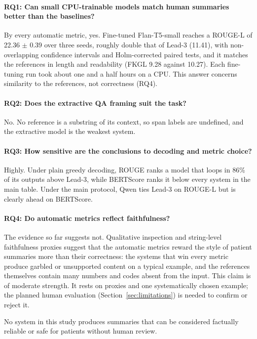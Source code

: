 \paragraph{RQ1: Can small CPU-trainable models match human summaries better than the baselines?} By every automatic metric, yes. Fine-tuned Flan-T5-small reaches a ROUGE-L of 22.36 $\pm$ 0.39 over three seeds, roughly double that of Lead-3 (11.41), with non-overlapping confidence intervals and Holm-corrected paired tests, and it matches the references in length and readability (FKGL 9.28 against 10.27). Each fine-tuning run took about one and a half hours on a CPU. This answer concerns similarity to the references, not correctness (RQ4).

\paragraph{RQ2: Does the extractive QA framing suit the task?} No. No reference is a substring of its context, so span labels are undefined, and the extractive model is the weakest system.

\paragraph{RQ3: How sensitive are the conclusions to decoding and metric choice?} Highly. Under plain greedy decoding, ROUGE ranks a model that loops in 86\% of its outputs above Lead-3, while BERTScore ranks it below every system in the main table. Under the main protocol, Qwen ties Lead-3 on ROUGE-L but is clearly ahead on BERTScore.

\paragraph{RQ4: Do automatic metrics reflect faithfulness?} The evidence so far suggests not. Qualitative inspection and string-level faithfulness proxies suggest that the automatic metrics reward the style of patient summaries more than their correctness: the systems that win every metric produce garbled or unsupported content on a typical example, and the references themselves contain many numbers and codes absent from the input. This claim is of moderate strength. It rests on proxies and one systematically chosen example; the planned human evaluation (Section~\ref{sec:limitations}) is needed to confirm or reject it.

No system in this study produces summaries that can be considered factually reliable or safe for patients without human review.
